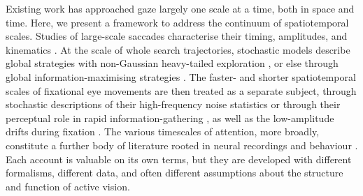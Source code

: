 Existing work has approached gaze largely one scale at a time, both in space and time. Here, we present a framework to address the continuum of spatiotemporal scales. Studies of large-scale saccades characterise their timing, amplitudes, and kinematics \cite{erkelens_coordination_2006, otero-millan_fixational_2014,  ludwig_mechanism_2009, rucci_control_2015}. At the scale of whole search trajectories, stochastic models describe global strategies with non-Gaussian heavy-tailed exploration \cite{NIPS2017_194cf6c2, blazejczyk_stochastic_2021, lencastre_dynamical_2025}, or else through global information-maximising strategies \cite{cornia_predicting_2018, bremer_predicting_2021, Ruarte2024.11.29.626088, huang_salicon_2015, kummerer_deepgaze_2022, kummerer_understanding_2017, bhandari_modeling_2025, chen_adaptive_2021, cornia_deep_2016, kittler_effective_2026}. The faster- and shorter spatiotemporal scales of fixational eye movements are then treated as a separate subject, through stochastic descriptions of their high-frequency noise statistics \cite{engbert_integrated_2011, vasudevan_stochastic_nodate, kuang_temporal_2012} or through their perceptual role in rapid information-gathering \cite{martinez-conde_role_2004, otero-millan_fixational_2014}, as well as the low-amplitude drifts during fixation \cite{ko_eye_2016, ryle_simultaneous_2015, rucci_control_2015, martinez-conde_role_2004}. The various timescales of attention, more broadly, constitute a further body of literature rooted in neural recordings and behaviour \cite{tan_theta_2024, kawashima_attentional_2022, spyropoulos_theta_2018}. Each account is valuable on its own terms, but they are developed with different formalisms, different data, and often different assumptions about the structure and function of active vision.

